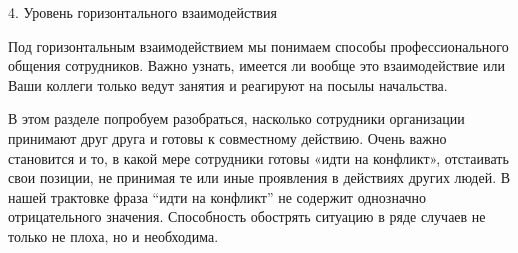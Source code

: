 \begin{frame}{4. Уровень горизонтального взаимодействия}

\tiny
Под  горизонтальным взаимодействием мы понимаем способы профессионального общения сотрудников. Важно узнать, имеется ли вообще это взаимодействие или Ваши коллеги только ведут занятия и реагируют на посылы начальства.  
\smallskip

В этом разделе попробуем разобраться, насколько сотрудники организации принимают друг друга и готовы к совместному действию. Очень важно становится и то,  в какой мере сотрудники готовы «идти на конфликт», отстаивать свои позиции, не принимая  те или иные проявления в действиях других людей. В нашей трактовке фраза “идти на конфликт” не содержит однозначно отрицательного значения. Способность обострять ситуацию в ряде случаев не только не плоха, но и необходима.

\end{frame}


